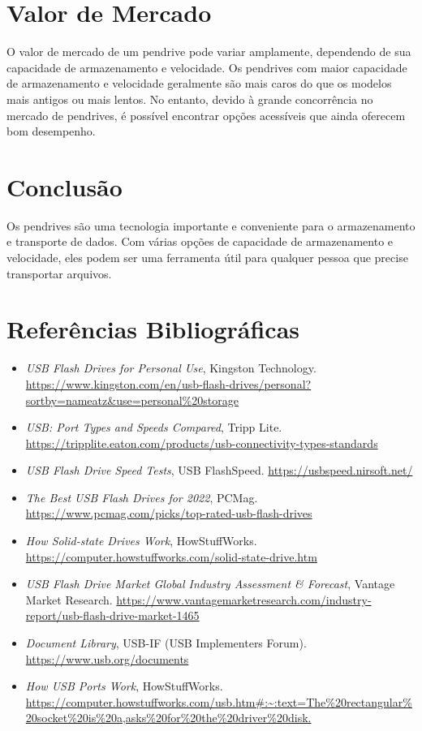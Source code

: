 \documentclass[a4paper, 12pt]{article}
\begin{document}
	\section{Valor de Mercado}
	
	O valor de mercado de um pendrive pode variar amplamente, dependendo de sua capacidade de armazenamento e velocidade. Os pendrives com maior capacidade de armazenamento e velocidade geralmente são mais caros do que os modelos mais antigos ou mais lentos. No entanto, devido à grande concorrência no mercado de pendrives, é possível encontrar opções acessíveis que ainda oferecem bom desempenho.
	
	\section{Conclusão}
	
	Os pendrives são uma tecnologia importante e conveniente para o armazenamento e transporte de dados. Com várias opções de capacidade de armazenamento e velocidade, eles podem ser uma ferramenta útil para qualquer pessoa que precise transportar arquivos.
	
	\newpage
	\section{Referências Bibliográficas}
	
\begin{itemize}
	\item \textit{USB Flash Drives for Personal Use}, Kingston Technology. \url{https://www.kingston.com/en/usb-flash-drives/personal?sortby=nameatz&use=personal%20storage}
	
	\item \textit{USB: Port Types and Speeds Compared}, Tripp Lite. \url{https://tripplite.eaton.com/products/usb-connectivity-types-standards}
	
	\item \textit{USB Flash Drive Speed Tests}, USB FlashSpeed. \url{https://usbspeed.nirsoft.net/}
	
	\item \textit{The Best USB Flash Drives for 2022}, PCMag. \url{https://www.pcmag.com/picks/top-rated-usb-flash-drives}
	
	\item \textit{How Solid-state Drives Work}, HowStuffWorks. \url{https://computer.howstuffworks.com/solid-state-drive.htm}
	
	\item \textit{USB Flash Drive Market Global Industry Assessment \& Forecast}, Vantage Market Research. \url{https://www.vantagemarketresearch.com/industry-report/usb-flash-drive-market-1465}
	
	\item \textit{Document Library}, USB-IF (USB Implementers Forum). \url{https://www.usb.org/documents}
	
	\item \textit{How USB Ports Work}, HowStuffWorks. \url{https://computer.howstuffworks.com/usb.htm#:~:text=The%20rectangular%20socket%20is%20a,asks%20for%20the%20driver%20disk.}
\end{itemize}
	
\end{document}
